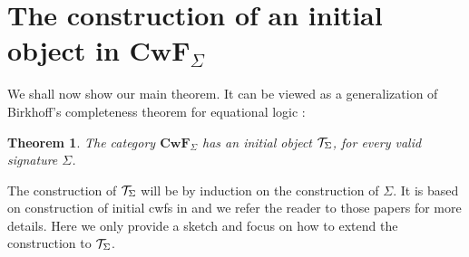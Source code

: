 \documentclass{lmcs}
\newtheorem{theorem}{Theorem}
\def\D{\mathcal{D}}
\def\Cwf{\mathbf{CwF}}
\begin{document}
%

\section{The construction of an initial object in $\Cwf_\Sigma$}\label{initial-gat}

We shall now show our main theorem. It can be viewed as a generalization of Birkhoff's completeness theorem for equational logic \cite{birkhoff}:
\begin{theorem}
The category $\Cwf_\Sigma$ has an initial object ${\mathcal T}_\Sigma$,
for every valid signature $\Sigma$.
\end{theorem}

The construction of ${\mathcal T}_\Sigma$ will be by induction on the construction of $\Sigma$. It is based on construction of initial cwfs in \cite{castellan:tlca2015,castellan:lmcs} and we refer the reader to those papers for more details. Here we only provide a sketch and focus on how to extend the construction to ${\mathcal T}_\Sigma$.
\end{document}
